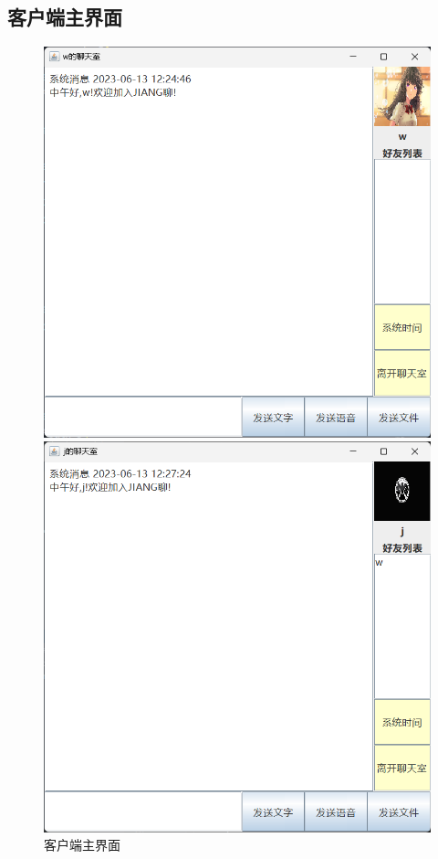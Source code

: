 \documentclass[UTF8,12pt]{article}
\begin{document}
\subsection{客户端主界面}
\begin{figure}[htbp]
    \centering
    \begin{minipage}{0.4\textwidth}
        \centering
        \includegraphics[width=1.0\textwidth]{img/13.png}
    \end{minipage}
    \begin{minipage}{0.4\textwidth}
        \centering
        \includegraphics[width=1.0\textwidth]{img/14.png}
    \end{minipage}
    \caption{客户端主界面}
\end{figure}
\end{document}

